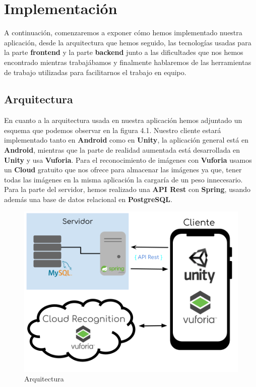 
\cleardoublepage


\chapter{Implementación}
\label{makereference4}
A continuación, comenzaremos a exponer cómo hemos implementado nuestra aplicación, desde la arquitectura que hemos seguido, las tecnologías usadas para la parte 
\textbf{frontend} y la parte \textbf{backend} junto a las dificultades que nos hemos encontrado mientras trabajábamos y finalmente hablaremos de las herramientas de trabajo
utilizadas para facilitarnos el trabajo en equipo.
\section{Arquitectura}
\label{makereference4.1}
En cuanto a la arquitectura usada en nuestra aplicación hemos adjuntado un esquema que podemos observar en la figura 4.1. Nuestro cliente estará implementado tanto en \textbf{Android}
como en \textbf{Unity}, la aplicación general está en \textbf{Android}, mientras que la parte de realidad aumentada está desarrollada en \textbf{Unity} y usa \textbf{Vuforia}. Para el reconocimiento
de imágenes con \textbf{Vuforia} usamos un \textbf{Cloud} gratuito que nos ofrece para almacenar las imágenes ya que, tener todas las imágenes en la misma aplicación la cargaría de un peso innecesario.
Para la parte del servidor, hemos realizado una \textbf{API Rest} con \textbf{Spring}, usando además una base de datos relacional en \textbf{PostgreSQL}. 
\begin{figure}[H]
    \centering
    \includegraphics[width=6in]{figures/Arquitectura.png}
    \caption{Arquitectura}
\end{figure}
